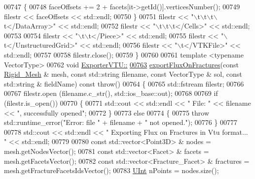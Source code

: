 \begin{DoxyCode}
00747     \{
00748         faceOffsets += 2 + facets[it->getId()].verticesNumber();
00749         filestr << faceOffsets << std::endl;
00750     \}
00751     filestr << \textcolor{stringliteral}{"\(\backslash\)t\(\backslash\)t\(\backslash\)t\(\backslash\)t</DataArray>"} << std::endl;
00752     filestr << \textcolor{stringliteral}{"\(\backslash\)t\(\backslash\)t\(\backslash\)t</Cells>"} << std::endl;
00753 
00754     filestr << \textcolor{stringliteral}{"\(\backslash\)t\(\backslash\)t</Piece>"} << std::endl;
00755     filestr << \textcolor{stringliteral}{"\(\backslash\)t</UnstructuredGrid>"} << std::endl;
00756     filestr << \textcolor{stringliteral}{"\(\backslash\)t</VTKFile>"} << std::endl;
00757 
00758     filestr.close();
00759 \}
00760 
00761 \textcolor{keyword}{template} <\textcolor{keyword}{typename} VectorType>
00762 \textcolor{keywordtype}{void} \hyperlink{classFVCode3D_1_1ExporterVTU_a1bca940b11053faa1a928bf3b19709af}{ExporterVTU::}
\hypertarget{ExportVTU_8hpp_source.tex_l00763}{}\hyperlink{classFVCode3D_1_1ExporterVTU_a1bca940b11053faa1a928bf3b19709af}{00763} \hyperlink{classFVCode3D_1_1ExporterVTU_a1bca940b11053faa1a928bf3b19709af}{exportFluxOnFractures}(\textcolor{keyword}{const} \hyperlink{classFVCode3D_1_1Rigid__Mesh}{Rigid\_Mesh} & mesh, \textcolor{keyword}{const} std::string filename, \textcolor{keyword}{
      const} VectorType & sol, \textcolor{keyword}{const} std::string & fieldName) \textcolor{keyword}{const} \textcolor{keywordflow}{throw}()
00764 \{
00765     std::fstream filestr;
00766 
00767     filestr.open (filename.c\_str(), std::ios\_base::out);
00768 
00769     \textcolor{keywordflow}{if} (filestr.is\_open())
00770     \{
00771         std::cout << std::endl << \textcolor{stringliteral}{" File: "} << filename << \textcolor{stringliteral}{", successfully opened"};
00772     \}
00773     \textcolor{keywordflow}{else}
00774     \{
00775         \textcolor{keywordflow}{throw} std::runtime\_error(\textcolor{stringliteral}{"Error: file "} + filename + \textcolor{stringliteral}{" not opened."});
00776     \}
00777 
00778     std::cout << std::endl << \textcolor{stringliteral}{" Exporting Flux on Fractures in Vtu format... "} << std::endl;
00779 
00780     \textcolor{keyword}{const} std::vector<Point3D> & nodes = mesh.getNodesVector();
00781     \textcolor{keyword}{const} std::vector<Facet> & facets = mesh.getFacetsVector();
00782     \textcolor{keyword}{const} std::vector<Fracture\_Facet> & fractures = mesh.getFractureFacetsIdsVector();
00783     \hyperlink{namespaceFVCode3D_a4bf7e328c75d0fd504050d040ebe9eda}{UInt} nPoints = nodes.size();

\end{DoxyCode}

